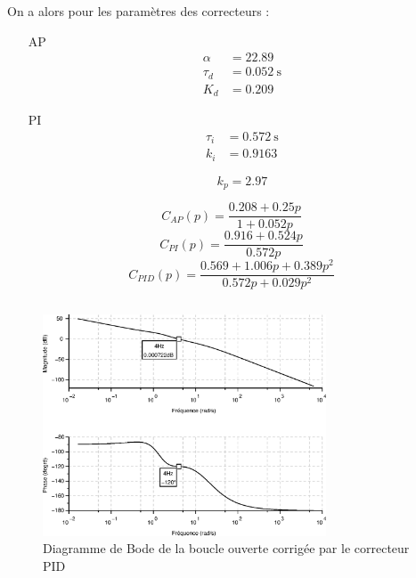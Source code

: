 On a alors pour les paramètres des correcteurs :
\begin{itemize}
    \item[AP] 
        \begin{align*}
            \alpha&=22.89\\
            \tau_d&=\SI{0.052}{\second}\\
            K_d&=0.209
        \end{align*}
    \item[PI]
        \begin{align*}
            \tau_i&=\SI{0.572}{\second}\\
            k_i&=0.9163
        \end{align*}

\[
    k_p=2.97
\]
\end{itemize}
\[
    C_{AP}(p)=\dfrac{0.208 + 0.25p}{1+0.052p}
\]
\[
    C_{PI}(p)=\dfrac{0.916 + 0.524p}{0.572p}
\]
\[
    C_{PID}(p)=\dfrac{0.569+1.006p+0.389p^2}{0.572p+ 0.029p^2}  
\]
\inputminted{scilab}{codes/scilab/code_q16_chap_correction.sce}
\begin{figure}
    \centering
    \includegraphics[width=0.75\textwidth]{fig/chap_correction/bode_BOCPID.eps}
    \caption{Diagramme de Bode de la boucle ouverte corrigée par 
    le correcteur PID}
\end{figure}
